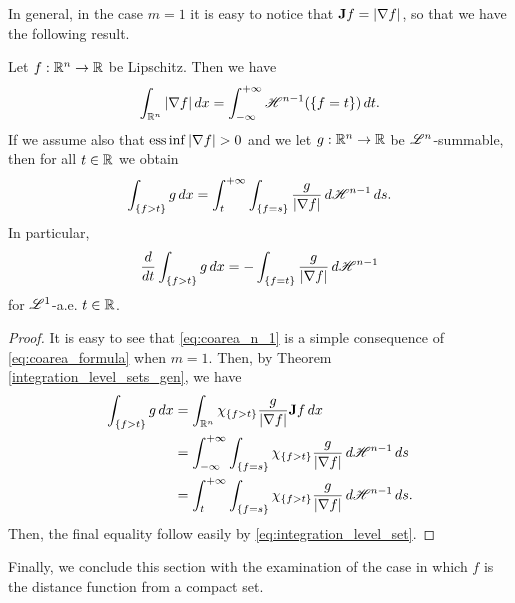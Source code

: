 In general, in the case $m = 1$ it is easy to notice that ${\bf J} f = |\nabla f|$, so that we have the following result.

\begin{theorem} \label{integration_level_sets}
Let $f : \mathbb{R}^{n} \to \mathbb{R}$ be Lipschitz. Then we have
\begin{equation} \label{eq:coarea_n_1}
\int_{\mathbb{R}^{n}} |\nabla f| \, dx = \int_{- \infty}^{+ \infty} \mathscr{H}^{n - 1}(\{f = t\}) \, dt.
\end{equation}
If we assume also that ${\rm ess} \inf |\nabla f| > 0$ and we let $g : \mathbb{R}^{n} \to \mathbb{R}$ be $\mathscr{L}^{n}$-summable, then for all $t \in \mathbb{R}$ we obtain
\begin{equation} \label{eq:integration_level_set}
\int_{\{f > t \}} g \, dx = \int_{t}^{+ \infty} \int_{\{f =s\}} \frac{g}{|\nabla f|} \, d \mathscr{H}^{n - 1} \, ds.
\end{equation}
In particular, 
\begin{equation*}
\frac{d}{dt} \int_{\{f > t\}} g \, dx = - \int_{\{f = t\}} \frac{g}{|\nabla f|} \, d \mathscr{H}^{n -1}
\end{equation*}
for $\mathscr{L}^{1}$-a.e. $t \in \mathbb{R}$.
\end{theorem}
\begin{proof}
It is easy to see that \eqref{eq:coarea_n_1} is a simple consequence of \eqref{eq:coarea_formula} when $m = 1$. Then, by Theorem \ref{integration_level_sets_gen}, we have
\begin{align*}
\int_{\{f > t\}} g \, dx & = \int_{\mathbb{R}^{n}} \chi_{\{f > t\}} \frac{g}{|\nabla f|} {\bf J} f \, dx \\
& = \int_{- \infty}^{+ \infty} \int_{\{ f = s\}} \chi_{\{f > t\}} \frac{g}{|\nabla f|} \, d \mathscr{H}^{n - 1} \, ds \\
& = \int_{t}^{+ \infty} \int_{\{ f = s\}} \chi_{\{f > t\}} \frac{g}{|\nabla f|} \, d \mathscr{H}^{n - 1} \, ds.
\end{align*}
Then, the final equality follow easily by \eqref{eq:integration_level_set}.
\end{proof}

Finally, we conclude this section with the examination of the case in which $f$ is the distance function from a compact set.

